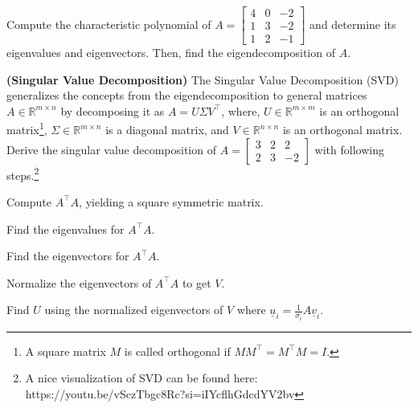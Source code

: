 \documentclass{article}
\theoremstyle{definition}
\begin{document}
\begin{question}[start=0]
\begin{question}
		Compute the characteristic polynomial of $A = \begin{bmatrix}
			4 & 0 & -2 \\
			1 & 3 & -2 \\
			1 & 2 & -1
		\end{bmatrix}$ and determine its eigenvalues and eigenvectors. Then, find the eigendecomposition of $A$.
		\item \textbf{(Singular Value Decomposition)} The Singular Value Decomposition (SVD) generalizes the concepts from the eigendecomposition to general matrices $A \in \mathbb{R}^{m \times n}$ by decomposing it as $A = U \Sigma V^\top$, where, $U \in \mathbb{R}^{m \times m}$ is an orthogonal matrix\footnote{A square matrix $M$ is called orthogonal if $MM^\top = M^\top M = I$.}, $\Sigma \in \mathbb{R}^{m \times n}$ is a diagonal matrix, and $V \in \mathbb{R}^{n \times n}$ is an orthogonal matrix.\\
		Derive the singular value decomposition of $A = \begin{bmatrix}
			3 & 2 & 2\\
			2 & 3 & -2
		\end{bmatrix}$ with following steps.\footnote{A nice visualization of SVD can be found here: https://youtu.be/vSczTbgc8Rc?si=iIYcflhGdcdYV2bv}
		\begin{question}
			\item Compute $A^\top A$, yielding a square symmetric matrix.
			\item Find the eigenvalues for $A^\top A$.
			\item Find the eigenvectors for $A^\top A$.
			\item Normalize the eigenvectors of $A^\top A$ to get $V$.
			\item Find $U$ using the normalized eigenvectors of $V$ where $\underline{u}_i = \frac{1}{\sigma_i} A \underline{v}_i$.
		\end{question}
	\end{question}

	
	

\end{question}
\end{document}
